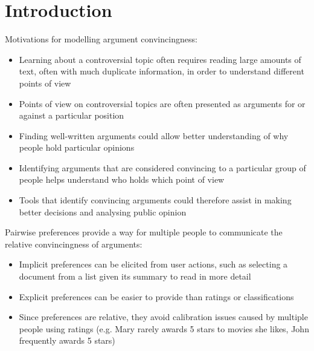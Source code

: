 \section{Introduction}\label{sec:intro}

Motivations for modelling argument convincingness:
\begin{itemize}
  \item Learning about a controversial topic often requires reading large amounts of text, often with much duplicate information, in order to understand different points of view
  \item Points of view on controversial topics are often presented as arguments for or against a particular position
  \item Finding well-written arguments could allow better understanding of why people hold particular opinions
  \item Identifying arguments that are considered convincing to a particular group of people helps understand who holds which point of view
  \item Tools that identify convincing arguments could therefore assist in making better decisions and analysing public opinion
\end{itemize}

Pairwise preferences provide a way for multiple people to communicate the relative convincingness of arguments:
\begin{itemize}
  \item Implicit preferences can be elicited from user actions, such as selecting a document from a list given its summary to read in more detail
  \item Explicit preferences can be easier to provide than ratings or classifications
  \item Since preferences are relative, they avoid calibration issues caused by multiple people using ratings (e.g. Mary rarely awards 5 stars to movies she likes, John frequently awards 5 stars)
\end{itemize}
  
